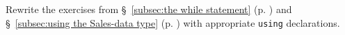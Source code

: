%
%
\begin{question}
Rewrite the exercises from \S~\ref{subsec:the while statement} (p. \pageref{subsec:the while statement}) and \S~\ref{subsec:using the Sales-data type} (p. \pageref{subsec:using the Sales-data type})
with appropriate \verb|using| declarations.
\end{question}
